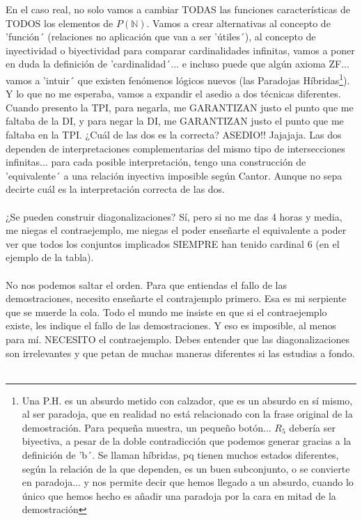	\noindent
	En el caso real, no solo vamos a cambiar TODAS las funciones características de TODOS los elementos de $P(\mathbb{N})$. Vamos a crear alternativas al concepto de 'función´ (relaciones no aplicación que van a ser 'útiles´), al concepto de inyectividad o biyectividad para comparar cardinalidades infinitas, vamos a poner en duda la definición de 'cardinalidad´... e incluso puede que algún axioma ZF... vamos a 'intuir´ que existen fenómenos lógicos nuevos (las Paradojas Híbridas\footnote{Una P.H. es un absurdo metido con calzador, que es un absurdo en sí mismo, al ser paradoja, que en realidad no está relacionado con la frase original de la demostración. Para pequeña muestra, un pequeño botón... $R_{5}$ debería ser biyectiva, a pesar de la doble contradicción que podemos generar gracias a la definición de 'b´. Se llaman híbridas, pq tienen muchos estados diferentes, según la relación de la que dependen, es un buen subconjunto, o se convierte en paradoja... y nos permite decir que hemos llegado a un absurdo, cuando lo único que hemos hecho es añadir una paradoja por la cara en mitad de la demostración}). Y lo que no me esperaba, vamos a expandir el asedio a dos técnicas diferentes. Cuando presento la TPI, para negarla, me GARANTIZAN justo el punto que me faltaba de la DI, y para negar la DI, me GARANTIZAN justo el punto que me faltaba en la TPI. ¿Cuál de las dos es la correcta? ASEDIO!! Jajajaja. Las dos dependen de interpretaciones complementarias del mismo tipo de intersecciones infinitas... para cada posible interpretación, tengo una construcción de 'equivalente´ a una relación inyectiva imposible según Cantor. Aunque no sepa decirte cuál es la interpretación correcta de las dos.\\\\

	\noindent
	¿Se pueden construir diagonalizaciones? Sí, pero si no me das 4 horas y media, me niegas el contraejemplo, me niegas el poder enseñarte el equivalente a poder ver que todos los conjuntos implicados SIEMPRE han tenido cardinal 6 (en el ejemplo de la tabla).\\\\
	
	\noindent
	No nos podemos saltar el orden. Para que entiendas el fallo de las demostraciones, necesito enseñarte el contrajemplo primero. Esa es mi serpiente que se muerde la cola.	Todo el mundo me insiste en que si el contraejemplo existe, les indique el fallo de las demostraciones. Y eso es imposible, al menos para mí. NECESITO el contraejemplo. Debes entender que las diagonalizaciones son irrelevantes y que petan de muchas maneras diferentes si las estudias a fondo.
	\\\\
	
